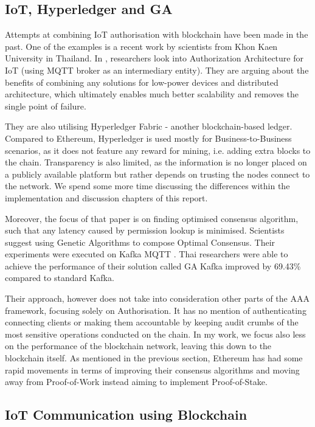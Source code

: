\subsection{IoT, Hyperledger and GA}
Attempts at combining IoT authorisation with blockchain have been made in the past. One of the examples is a recent work by scientists from Khon Kaen University in Thailand. In \citet{klaokliang2018novel}, researchers look into Authorization Architecture for IoT (using MQTT broker as an intermediary entity). They are arguing about the benefits of combining any solutions for low-power devices and distributed architecture, which ultimately enables much better scalability and removes the single point of failure.

They are also utilising Hyperledger Fabric - another blockchain-based ledger. Compared to Ethereum, Hyperledger \cite{cachin2016architecture} is used mostly for Business-to-Business scenarios, as it does not feature any reward for mining, i.e. adding extra blocks to the chain. Transparency is also limited, as the information is no longer placed on a publicly available platform but rather depends on trusting the nodes connect to the network. We spend some more time discussing the differences within the implementation and discussion chapters of this report.

Moreover, the focus of that paper is on finding optimised consensus algorithm, such that any latency caused by permission lookup is minimised. Scientists suggest using Genetic Algorithms to compose Optimal Consensus. Their experiments were executed on Kafka MQTT \cite{waehner_2019}. Thai researchers were able to achieve the performance of their solution called GA Kafka improved by 69.43\% compared to standard Kafka.

Their approach, however does not take into consideration other parts of the AAA framework, focusing solely on Authorisation. It has no mention of authenticating connecting clients or making them accountable by keeping audit crumbs of the most sensitive operations conducted on the chain. In my work, we focus also less on the performance of the blockchain network, leaving this down to the blockchain itself. As mentioned in the previous section, Ethereum has had some rapid movements in terms of improving their consensus algorithms and moving away from Proof-of-Work instead aiming to implement Proof-of-Stake.

\subsection{IoT Communication using Blockchain}

